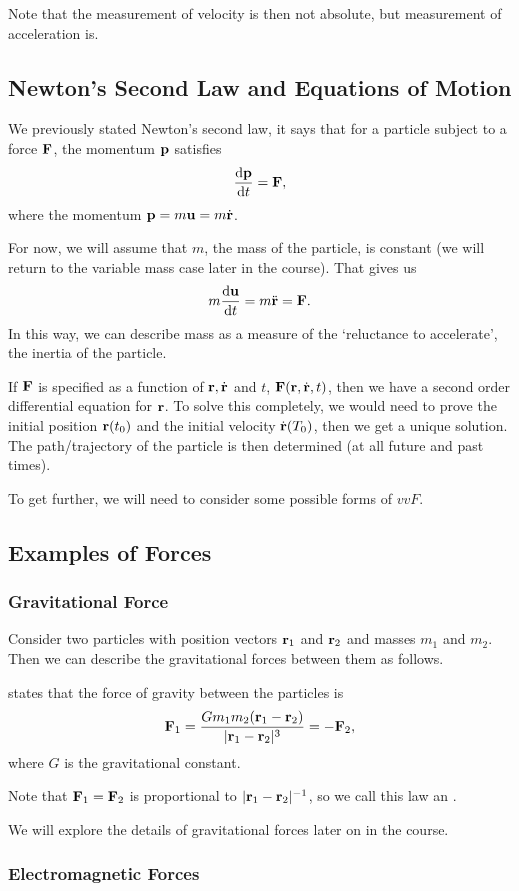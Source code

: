 \documentclass[a4paper]{scrartcl}
\newcommand{\newsection}{\subsection}
\newcommand{\newsubsection}{\subsubsection}
\begin{document}
Note that the measurement of velocity is then not absolute, but measurement of acceleration is.

\newsection{Newton's Second Law and Equations of Motion}

We previously stated Newton's second law, it says that for a particle subject to a force $\mathbf{F}$, the momentum $\mathbf{p}$ satisfies
$$
\frac{
	\mathrm{d} \mathbf{p}
}{\mathrm{d} t} = \mathbf{F},
$$
where the momentum $\mathbf{p} = m \mathbf{u} = m \dot{\mathbf{r}}$. 

For now, we will assume that $m$, the mass of the particle, is constant (we will return to the variable mass case later in the course). That gives us
$$
m \frac{\mathrm{d} \mathbf{u}}{\mathrm{d} t} = m \ddot{\mathbf{r}} = \mathbf{F}.
$$
In this way, we can describe mass as a measure of the `reluctance to accelerate', the inertia of the particle.

If $\mathbf{F}$ is specified as a function of $\mathbf{r}, \dot{\mathbf{r}}$ and $t$, $\mathbf{F}(\mathbf{r}, \dot{\mathbf{r}}, t)$, then we have a second order differential equation for $\mathbf{r}$. To solve this completely, we would need to prove the initial position $\mathbf{r}(t_0)$ and the initial velocity $\dot{\mathbf{r}}(T_0)$, then we get a unique solution. The path/trajectory of the particle is then determined (at all future and past times).

To get further, we will need to consider some possible forms of $vv{F}$.

\newsection{Examples of Forces}

\newsubsection{Gravitational Force}

Consider two particles with position vectors $\mathbf{r}_1$ and $\mathbf{r}_2$ and masses $m_1$ and $m_2$. Then we can describe the gravitational forces between them as follows.


\begin{law*}
	 states that the force of gravity between the particles is
	$$
	\mathbf{F}_1 = \frac{G m_1 m_2 (\mathbf{r}_1 - \mathbf{r}_2)}{|\mathbf{r}_1 - \mathbf{r}_2|^3} = -\mathbf{F}_2,
	$$
	where $G$ is the gravitational constant.
\end{law*}

Note that $\mathbf{F}_1 = \mathbf{F}_2$ is proportional to $|\mathbf{r}_1 - \mathbf{r}_2|^{-1}$, so we call this law an .

We will explore the details of gravitational forces later on in the course.

\newsubsection{Electromagnetic Forces}
\end{document}
